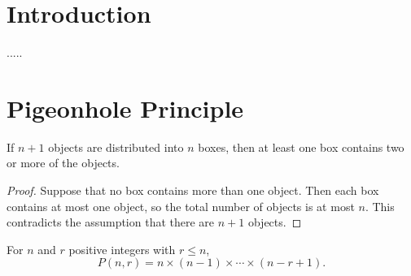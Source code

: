 %

\chapter{Introduction}

.....

\chapter{Pigeonhole Principle}

  

\begin{theorem}
  \label{thm:pigeonhole_principle_simple} 
  \leanok
  If $n + 1$ objects are distributed into $n$ boxes, then at least one box contains two or more of the objects.
\end{theorem}

\begin{proof}
  \leanok
  Suppose that no box contains more than one object. Then each box contains at most one object, so the total number of objects is at most $n$. This contradicts the assumption that there are $n + 1$ objects.
\end{proof}

\begin{theorem}
  \label{thm:2.2.1}
  For $n$ and $r$ positive integers with $r \leq n$, 
  \[ P(n,r)= n\times(n- 1) \times \cdots \times (n-r+1).  \]
\end{theorem}


